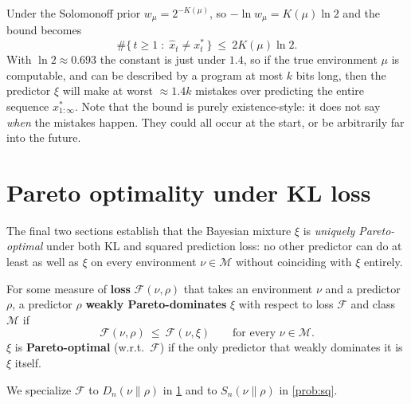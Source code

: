 \documentclass[fontsize=11pt, parskip=half]{scrartcl}
\newcommand{\Mc}{\mathcal{M}}
\newcommand{\Sn}[2]{S_{n}(#1 \parallel #2)}
\begin{document}
\begin{remark}
Under the Solomonoff prior $w_\mu = 2^{-K(\mu)}$, so $-\ln w_\mu = K(\mu)\ln 2$
and the bound becomes
\[
  \#\{\, t \geq 1 \;:\; \hat{x}_t \neq x_t^* \,\} ~\leq~ 2 K(\mu) \ln 2.
\]
With $\ln 2 \approx 0.693$ the constant is just under $1.4$, so if the true 
environment $\mu$ is computable, and can be described by a program at most $k$ bits long, 
then the predictor $\xi$ 
will make at worst $\approx 1.4 k$ mistakes over predicting the entire sequence $x^*_{1:\infty}$.
Note that the bound is purely existence-style: it does not say \emph{when}
the mistakes happen. They could all occur at the start, or be arbitrarily far into the future.
\end{remark}

\section{Pareto optimality under KL loss}\label{prob:kl}

The final two sections establish that the Bayesian mixture $\xi$ is
\emph{uniquely Pareto-optimal} under both KL and squared prediction loss:
no other predictor can do at least as well as $\xi$ on every environment
$\nu \in \Mc$ without coinciding with $\xi$ entirely. 


\begin{definition}\label{def:pareto}
For some measure of \textbf{loss} $\mathcal F(\nu, \rho)$ that takes an environment $\nu$ and a
predictor $\rho$, a predictor $\rho$ \textbf{weakly Pareto-dominates} $\xi$  with respect to 
loss $\mathcal{F}$ and class $\mathcal{M}$ if
\[
  \mathcal F(\nu, \rho) ~\leq~ \mathcal F(\nu, \xi)
  \qquad \text{for every } \nu \in \Mc.
\]
$\xi$ is \textbf{Pareto-optimal} (w.r.t.\ $\mathcal F$) if the only predictor
that weakly dominates it is $\xi$ itself.

We specialize $\mathcal F$ to $D_n(\nu \parallel \rho)$ in \cref{prob:kl} 
and to $\Sn{\nu}{\rho}$ in \cref{prob:sq}.
\end{definition}
\end{document}
